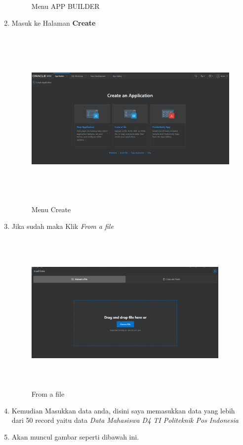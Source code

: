 \begin{enumerate}
\begin{figure}[!htbp]
\caption{Menu APP BUILDER}
\label{penanda}
\end{figure}
    \item Masuk ke Halaman \textbf{Create}
\begin{figure}[!htbp]
\centering
\includegraphics[width=11cm,height=9cm]{figures/C.PNG}
\caption{Menu Create}
\label{penanda}
\end{figure}
    \item Jika sudah maka Klik \textit{From a file}
\begin{figure}[!htbp]
\centering
\includegraphics[width=10cm,height=8cm]{figures/D.PNG}
\caption{From a file}
\label{penanda}
\end{figure}
\item Kemudian Masukkan data anda, disini saya memasukkan data yang lebih dari 50 record yaitu data \textit{Data Mahasiswa D4 TI Politeknik Pos Indonesia} 
\item Akan muncul gambar seperti dibawah ini.
\begin{figure}[!htbp]

\end{figure}
\end{enumerate}
